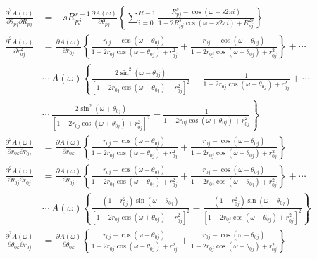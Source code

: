 \documentclass[a4paper,twoside,10pt,english]{report}
\begin{document}
\begin{raggedbottom}
\begin{align*}
\frac{\partial^{2}A\left(\omega\right)}{\partial\theta_{pj}\partial R_{pj}} &= -sR_{pj}^{s-1}\frac{\partial A\left(\omega\right)}{\partial\theta_{pj}}\left\{ \sum_{i=0}^{R-1}\frac{R_{pj}^{s}-\cos\left(\omega-s2\pi i\right)}{1-2R_{pj}^{s}\cos\left(\omega-s2\pi i\right)+R_{pj}^{2s}}\right\}\\
\frac{\partial^{2}A\left(\omega\right)}{\partial r_{0j}^{2}} &= \frac{\partial A\left(\omega\right)}{\partial r_{0j}}\left\{ \frac{r_{0j}-\cos\left(\omega-\theta_{0j}\right)}{1-2r_{0j}\cos\left(\omega-\theta_{0j}\right)+r_{0j}^{2}}+\frac{r_{0j}-\cos\left(\omega+\theta_{0j}\right)}{1-2r_{0j}\cos\left(\omega+\theta_{0j}\right)+r_{0j}^{2}}\right\} +\cdots\\
 & \cdots\, A\left(\omega\right)\left\{ \frac{2\sin^{2}\left(\omega-\theta_{0j}\right)}{\left[1-2r_{0j}\cos\left(\omega-\theta_{0j}\right)+r_{0j}^{2}\right]^{2}}-\frac{1}{1-2r_{0j}\cos\left(\omega-\theta_{0j}\right)+r_{0j}^{2}}+\cdots\right.\\
 & \left.\cdots\,\frac{2\sin^{2}\left(\omega+\theta_{0j}\right)}{\left[1-2r_{0j}\cos\left(\omega+\theta_{0j}\right)+r_{0j}^{2}\right]^{2}}-\frac{1}{1-2r_{0j}\cos\left(\omega+\theta_{0j}\right)+r_{0j}^{2}}\right\} \\
\frac{\partial^{2}A\left(\omega\right)}{\partial r_{0k}\partial r_{0j}} &= \frac{\partial A\left(\omega\right)}{\partial r_{0k}}\left\{ \frac{r_{0j}-\cos\left(\omega-\theta_{0j}\right)}{1-2r_{0j}\cos\left(\omega-\theta_{0j}\right)+r_{0j}^{2}}+\frac{r_{0j}-\cos\left(\omega+\theta_{0j}\right)}{1-2r_{0j}\cos\left(\omega+\theta_{0j}\right)+r_{0j}^{2}}\right\} \\
\frac{\partial^{2}A\left(\omega\right)}{\partial\theta_{0j}\partial r_{0j}} &= \frac{\partial A\left(\omega\right)}{\partial\theta_{0j}}\left\{ \frac{r_{0j}-\cos\left(\omega-\theta_{0j}\right)}{1-2r_{0j}\cos\left(\omega-\theta_{0j}\right)+r_{0j}^{2}}+\frac{r_{0j}-\cos\left(\omega+\theta_{0j}\right)}{1-2r_{0j}\cos\left(\omega+\theta_{0j}\right)+r_{0j}^{2}}\right\} +\cdots\\
 & \cdots\, A\left(\omega\right)\left\{ \frac{\left(1-r_{0j}^{2}\right)\sin\left(\omega+\theta_{0j}\right)}{\left[1-2r_{0j}\cos\left(\omega+\theta_{0j}\right)+r_{0j}^{2}\right]^{2}}-\frac{\left(1-r_{0j}^{2}\right)\sin\left(\omega-\theta_{0j}\right)}{\left[1-2r_{0j}\cos\left(\omega-\theta_{0j}\right)+r_{0j}^{2}\right]^{2}}\right\} \\
\frac{\partial^{2}A\left(\omega\right)}{\partial\theta_{0k}\partial r_{0j}} &= \frac{\partial A\left(\omega\right)}{\partial\theta_{0k}}\left\{ \frac{r_{0j}-\cos\left(\omega-\theta_{0j}\right)}{1-2r_{0j}\cos\left(\omega-\theta_{0j}\right)+r_{0j}^{2}}+\frac{r_{0j}-\cos\left(\omega+\theta_{0j}\right)}{1-2r_{0j}\cos\left(\omega+\theta_{0j}\right)+r_{0j}^{2}}\right\} \\

\end{align*}
\end{raggedbottom}
\end{document}
